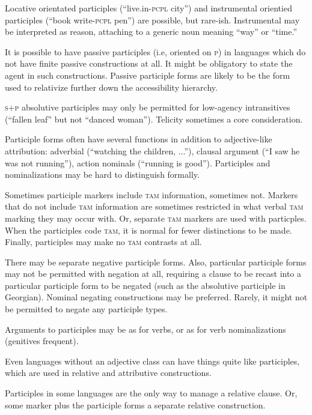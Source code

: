 \documentclass[11pt]{article}
\newcommand{\I}[1]{\textsc{#1}}   %
\begin{document}
Locative orientated participles (``live.in-\I{pcpl} city'') and
instrumental orientied participles (``book write-\I{pcpl} pen'') are
possible, but rare-ish.  Instrumental may be interpreted as reason,
attaching to a generic noun meaning ``way'' or ``time.''

It is possible to have passive participles (i.e, oriented on \I{p}) in
languages which do not have finite passive constructions at all.  It
might be obligatory to state the agent in such constructions.  Passive
participle forms are likely to be the form used to relativize further
down the accessibility hierarchy.

\I{s+p} absolutive participles may only be permitted for low-agency
intransitives (``fallen leaf'' but not ``danced woman'').  Telicity
sometimes a core consideration.

Participle forms often have several functions in addition to
adjective-like attribution: adverbial (``watching the children,
...''), clausal argument (``I saw he was not running''), action
nominals (``running is good'').  Participles and nominalizations may
be hard to distinguish formally.

Sometimes participle markers include \I{tam} information, sometimes
not.  Markers that do not include \I{tam} information are sometimes
restricted in what verbal \I{tam} marking they may occur with.  Or,
separate \I{tam} markers are used with particples.  When the
participles code \I{tam}, it is normal for fewer distinctions to be
made.  Finally, participles may make no \I{tam} contrasts at all.

There may be separate negative participle forms.  Also, particular
participle forms may not be permitted with negation at all, requiring
a clause to be recast into a particular participle form to be negated
(such as the absolutive participle in Georgian).  Nominal negating
constructions may be preferred.  Rarely, it might not be permitted to
negate any participle types.

Arguments to participles may be as for verbs, or as for verb
nominalizations (genitives frequent).

Even languages without an adjective class can have things quite like
participles, which are used in relative and attributive constructions. 

Participles in some languages are the only way to manage a relative
clause.  Or, some marker plus the participle forms a separate relative
construction. 
\end{document}
